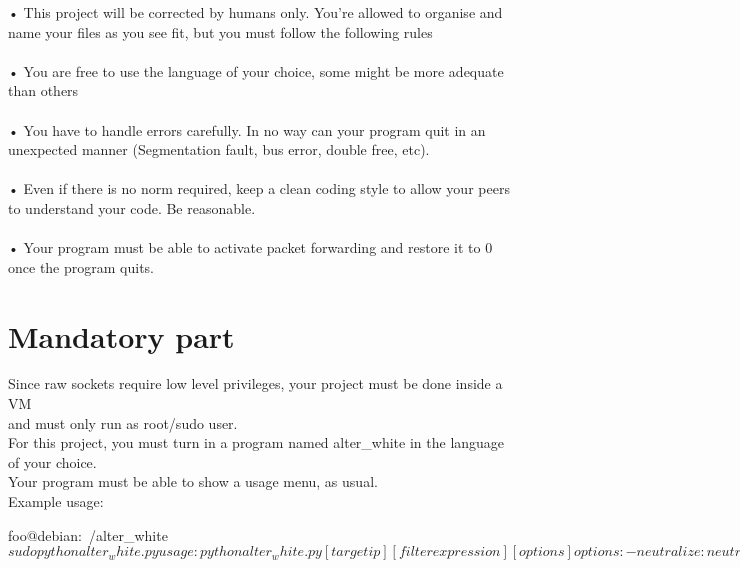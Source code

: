 \documentclass{42-en}
\begin{document}
    • This project will be corrected by humans only. You’re allowed to organise and name your files as you see fit, but you must follow the following rules\\
    \\
    • You are free to use the language of your choice, some might be more adequate than others\\
    \\
    • You have to handle errors carefully. In no way can your program quit in an unexpected manner (Segmentation fault, bus error, double free, etc).\\
    \\
    • Even if there is no norm required, keep a clean coding style to allow your peers to understand your code. Be reasonable.\\
    \\
    • Your program must be able to activate packet forwarding and restore it to 0 once the program quits.\\
   \newpage
\chapter{Mandatory part}

Since raw sockets require low level privileges, your project must be done inside a VM\\
and must only run as root/sudo user.\\

For this project, you must turn in a program named alter\_white in the language of your choice.\\
Your program must be able to show a usage menu, as usual.\\


Example usage:
\begin{42console}
    foo@debian:~/alter_white$ sudo python alter_white.py
usage:
    python alter_white.py [target ip] [filter expression] [options]

    options:
        - neutralize:                   neutralize target by flooding icmp packets
        - awesome bonus functionality:  do stuff
        - another great bonus option:   do some other stuff
    target ip:
        the victim of the attack
    filter expression:
        filter expression (tcpdump style) for monitoring rules

    foo@debian:~/alter_white$ 
 \end{42console}
\end{document}

